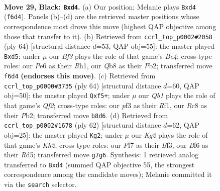 \documentclass[11pt]{article}
\begin{document}
\clearpage

\begin{figure}[p]\centering
\begin{subfigure}{0.46\textwidth}\centering
\resizebox{\linewidth}{!}{%
\newchessgame
\chessboard[
  setfen={1qr5/Bp3pk1/p3pb2/8/3Q3p/4PP2/PP4PP/R3R1K1 b - - 0 29},
  showmover=false,
  pgfstyle=straightmove, color=movearrow, markmove={f6-d4}
]}
\caption{}
\end{subfigure}\hfill
\begin{subfigure}{0.46\textwidth}\centering
\resizebox{\linewidth}{!}{%
\newchessgame
\chessboard[
  setfen={1r1r2k1/p4p2/8/1p1bPq1p/2p1B3/P5P1/1PQ1R1K1/7R w - - 0 33},
  showmover=false,
  pgfstyle=straightmove, color=movearrow, markmove={e4-d5}
]}
\caption{}
\end{subfigure}
\\[4pt]
\begin{subfigure}{0.46\textwidth}\centering
\resizebox{\linewidth}{!}{%
\newchessgame
\chessboard[
  setfen={4r3/p4r1k/1p1p3p/3Pbq2/8/6BP/PP3QPK/5R2 w - - 0 33},
  showmover=false,
  pgfstyle=straightmove, color=movearrow, markmove={f2-f5}
]}
\caption{}
\end{subfigure}\hfill
\begin{subfigure}{0.46\textwidth}\centering
\resizebox{\linewidth}{!}{%
\newchessgame
\chessboard[
  setfen={4r1k1/p4p1p/1b3q2/1Q1Rr1p1/1p6/5BPP/PP3P1K/5R2 w - - 15 32},
  showmover=false,
  pgfstyle=straightmove, color=movearrow, markmove={h2-g2}
]}
\caption{}
\end{subfigure}
\caption{\textbf{Move 29, Black: \texttt{Bxd4}.} (a) Our position; Melanie plays \texttt{Bxd4} (\texttt{f6d4}). Panels (b)--(d) are the retrieved master positions whose correspondence most drove this move (highest QAP objective among those that transfer to it). (b) Retrieved from \texttt{ccrl\_top\_p0002\#2058} (ply 64) [structural distance $d$=53, QAP obj=55]: the master played \texttt{Bxd5}; under $\mu$ our \emph{Bf3} plays the role of that game's \emph{Be4}; cross-type roles: our \emph{P}e6 as their \emph{R}h1, our \emph{Q}b8 as their \emph{P}b2; transferred move \texttt{f6d4} \textbf{(endorses this move)}. (c) Retrieved from \texttt{ccrl\_top\_p0000\#3735} (ply 64) [structural distance $d$=60, QAP obj=50]: the master played \texttt{Qxf5+}; under $\mu$ our \emph{Qb1} plays the role of that game's \emph{Qf2}; cross-type roles: our \emph{p}f3 as their \emph{R}f1, our \emph{R}c8 as their \emph{P}b2; transferred move \texttt{b8d6}. (d) Retrieved from \texttt{ccrl\_top\_p0002\#1678} (ply 62) [structural distance $d$=62, QAP obj=25]: the master played \texttt{Kg2}; under $\mu$ our \emph{Kg2} plays the role of that game's \emph{Kh2}; cross-type roles: our \emph{P}f7 as their \emph{B}f3, our \emph{B}f6 as their \emph{R}d5; transferred move \texttt{g7g6}. Synthesis: 1 retrieved analog transferred to \texttt{Bxd4} (summed QAP objective 55, the strongest correspondence among the candidate moves); Melanie committed it via the \texttt{search} selector.}
\label{fig:thought-m57}
\end{figure}
\end{document}

